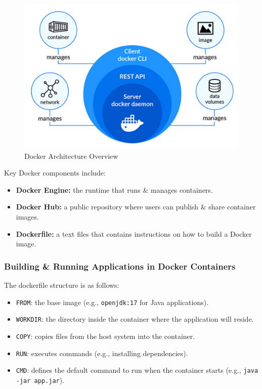 \documentclass[a4paper,11pt]{article}
\begin{document}
\begin{figure}[H]
    \centering \includegraphics[width=\textwidth]{images/docker_overview.png}
    \caption{Docker Architecture Overview}
\end{figure}

Key Docker components include:
\begin{itemize}
    \item   \textbf{Docker Engine:} the runtime that runs \& manages containers.
    \item   \textbf{Docker Hub:} a public repository where users can publish \& share container images.
    \item   \textbf{Dockerfile:} a text files that contains instructions on how to build a Docker image.
\end{itemize}

\subsubsection{Building \& Running Applications in Docker Containers}
The dockerfile structure is as follows:
\begin{itemize}
    \item   \texttt{FROM}: the base image (e.g., \verb|openjdk:17| for Java applications).
    \item   \texttt{WORKDIR}: the directory inside the container where the application will reside.
    \item   \texttt{COPY}: copies files from the host system into the container.
    \item   \texttt{RUN}: executes commands (e.g., installing dependencies).
    \item   \texttt{CMD}: defines the default command to run when the container starts (e.g., 
            \texttt{java -jar app.jar}).
\end{itemize}
\end{document}

